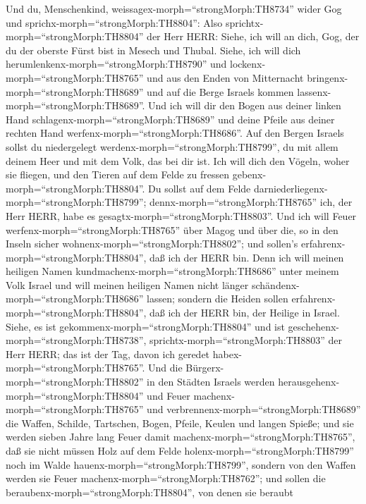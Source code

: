  Und du, Menschenkind,
weissagex-morph=``strongMorph:TH8734'' wider Gog und
sprichx-morph=``strongMorph:TH8804'': Also
sprichtx-morph=``strongMorph:TH8804'' der Herr HERR: Siehe, ich will an
dich, Gog, der du der oberste Fürst bist in Mesech und Thubal.
 Siehe, ich will dich
herumlenkenx-morph=``strongMorph:TH8790'' und
lockenx-morph=``strongMorph:TH8765'' und aus den Enden von Mitternacht
bringenx-morph=``strongMorph:TH8689'' und auf die Berge Israels kommen
lassenx-morph=``strongMorph:TH8689''.  Und ich will dir den
Bogen aus deiner linken Hand schlagenx-morph=``strongMorph:TH8689'' und
deine Pfeile aus deiner rechten Hand
werfenx-morph=``strongMorph:TH8686''.  Auf den Bergen
Israels sollst du niedergelegt werdenx-morph=``strongMorph:TH8799'', du
mit allem deinem Heer und mit dem Volk, das bei dir ist. Ich will dich
den Vögeln, woher sie fliegen, und den Tieren auf dem Felde zu fressen
gebenx-morph=``strongMorph:TH8804''.  Du sollst auf dem
Felde darniederliegenx-morph=``strongMorph:TH8799'';
dennx-morph=``strongMorph:TH8765'' ich, der Herr HERR, habe es
gesagtx-morph=``strongMorph:TH8803''.  Und ich will Feuer
werfenx-morph=``strongMorph:TH8765'' über Magog und über die, so in den
Inseln sicher wohnenx-morph=``strongMorph:TH8802''; und sollen's
erfahrenx-morph=``strongMorph:TH8804'', daß ich der HERR bin.
 Denn ich will meinen heiligen Namen
kundmachenx-morph=``strongMorph:TH8686'' unter meinem Volk Israel und
will meinen heiligen Namen nicht länger
schändenx-morph=``strongMorph:TH8686'' lassen; sondern die Heiden sollen
erfahrenx-morph=``strongMorph:TH8804'', daß ich der HERR bin, der
Heilige in Israel.  Siehe, es ist
gekommenx-morph=``strongMorph:TH8804'' und ist
geschehenx-morph=``strongMorph:TH8738'',
sprichtx-morph=``strongMorph:TH8803'' der Herr HERR; das ist der Tag,
davon ich geredet habex-morph=``strongMorph:TH8765''.  Und
die Bürgerx-morph=``strongMorph:TH8802'' in den Städten Israels werden
herausgehenx-morph=``strongMorph:TH8804'' und Feuer
machenx-morph=``strongMorph:TH8765'' und
verbrennenx-morph=``strongMorph:TH8689'' die Waffen, Schilde, Tartschen,
Bogen, Pfeile, Keulen und langen Spieße; und sie werden sieben Jahre
lang Feuer damit machenx-morph=``strongMorph:TH8765'',  daß
sie nicht müssen Holz auf dem Felde holenx-morph=``strongMorph:TH8799''
noch im Walde hauenx-morph=``strongMorph:TH8799'', sondern von den
Waffen werden sie Feuer machenx-morph=``strongMorph:TH8762''; und sollen
die beraubenx-morph=``strongMorph:TH8804'', von denen sie beraubt
